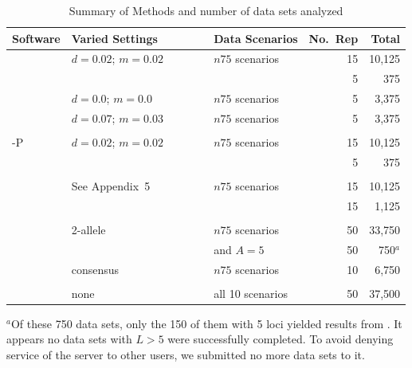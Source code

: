 \begin{table}
\begin{center}
\caption{Summary of Methods and number of data sets analyzed \label{tab:methsum}}
\begin{tabular}{lllrr}
\hline
Software & Varied Settings~~~~~~~ & Data Scenarios & No.~Rep & Total \\ \hline
\colony{} & $d=0.02$; $m=0.02$ & $n75$ scenarios & 15 & 10,125 \\
          &                  & \lottalarge{}          & 5  &    375 \\      
          & $d=0.0$; $m=0.0$ & $n75$ scenarios & 5  &    3,375 \\ 
          & $d=0.07$; $m=0.03$ & $n75$ scenarios & 5  &    3,375 \\     
 \\
\colony{}-P & $d=0.02$; $m=0.02$ & $n75$ scenarios & 15 & 10,125 \\
            &                  & \lottalarge{}          & 5  &    375\\
 \\
\prt{}      &    See Appendix~5              & $n75$ scenarios & 15 & 10,125 \\
            &                  & \lottalarge{}          & 15  &    1,125\\
\\
\kinalyzer{}~~~ & 2-allele      &   $n75$ scenarios & 50 & 33,750 \\ 
             &               &   \lottalarge{} and $A=5$ & 50 & 750$^a$ \\ 
             & consensus      &   $n75$ scenarios  & 10 & 6,750 \\
\\
\familyfinder{}  &  none  &  all 10 scenarios  &  50  &  37,500 \\
\hline
\end{tabular}
\end{center}
{\footnotesize
$\mbox{}^a$Of these 750 data sets, only the 150 of them with 5 loci yielded results from \kinalyzer{}.  
It appears no data sets with $L>5$ were successfully completed. To avoid denying service of the 
\kinalyzer{} server to other users, we submitted no more \lottalarge{} data sets to it.   
}
\end{table}


